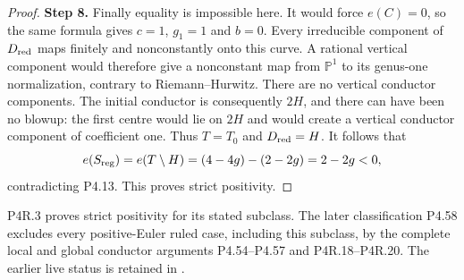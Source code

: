 \begin{proof}
\noindent\textbf{Step 8.} Finally equality is impossible here. It would force
$e(C)=0$, so the same formula gives $c=1$, $g_1=1$
and $b=0$. Every irreducible component of
$D_{\rm red}$ maps finitely and nonconstantly onto
this curve. A rational vertical component would
therefore give a nonconstant map from $\mathbb P^1$
to its genus-one normalization, contrary to
Riemann--Hurwitz. There are no vertical conductor
components. The initial conductor is consequently
$2H$, and there can have been no blowup: the first
centre would lie on $2H$ and would create a vertical
conductor component of coefficient one. Thus
$T=T_0$ and $D_{\rm red}=H$. It follows that
\[
 e(S_{\rm reg})=e(T\setminus H)
       =(4-4g)-(2-2g)=2-2g<0,
\]
contradicting P4.13. This proves strict positivity.
\end{proof}

P4R.3 proves strict positivity for its stated subclass.
The later classification P4.58 excludes every positive-Euler
ruled case, including this subclass, by the complete local
and global conductor arguments P4.54--P4.57 and P4R.18--P4R.20.
The earlier live status is retained in
.

